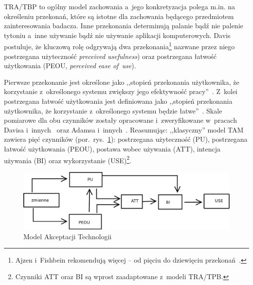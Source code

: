 \documentclass[brudnopis,xodstep]{wkmgr}
\begin{document}
TRA/TBP to ogólny model zachowania a~jego konkretyzacja
polega m.in. na określeniu przekonań, które są istotne dla zachowania
będącego przedmiotem zainteresowania badacza. Inne przekonania
determinują palanie bądź nie palenie tytoniu a~inne używanie bądź nie
używanie aplikacji komputerowych.  Davis postuluje, że kluczową rolę
odgrywają dwa przekonania\footnote{Ajzen i~Fishbein rekomendują więcej
  -- od pięciu do dziewięciu
  przekonań~\citep[s.~218]{FishbeinAjzen1975}.} nazwane przez niego
postrzegana użyteczność \emph{preceived
  usefulness\/}) oraz postrzegana łatwość
użytkowania (PEOU, \emph{perceived ease of~use\/}).

Pierwsze przekonanie jest określone
jako ,,stopień przekonania użytkownika, że korzystanie z~określonego
systemu zwiększy jego efektywność
pracy''~\citep{DavisetAl1989,Davis1989}.  Z~kolei postrzegana łatwość
użytkowania jest definiowana jako ,,stopień przekonania użytkownika,
że korzystanie z~określonego systemu będzie
łatwe''~\citep{DavisetAl1989,Davis1989}. Skale pomiarowe dla obu
czynników zostały opracowane i~zweryfikowane w~pracach
Davisa i~innych~\citeyearpar{Davis1989} oraz Adamsa i~innych~\citeyearpar{AdamsNelsonTodd1992}.
Reasumując:
,,klasyczny'' model TAM zawiera pięć czynników
(por.~rys.~\ref{r1-TAM}): postrzegana użyteczność (PU), postrzegana
łatwość użytkowania (PEOU), postawa wobec używania (ATT), intencja
używania (BI) oraz wykorzystanie (USE)\footnote{Czynniki ATT oraz BI
  są wprost zaadaptowane z~modeli TRA/TPB.}.

\begin{figure}[!tbh]
  \includegraphics[width=\textwidth]{./TAM-pl}
\caption{Model Akceptacji Technologii}
\label{r1-TAM}
\end{figure}
\end{document}
